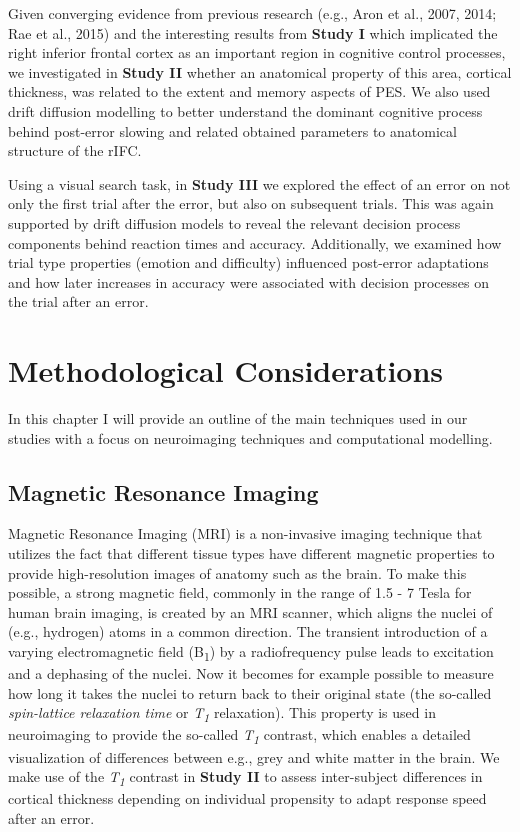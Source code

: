 \documentclass[12pt,openany]{book}
\theoremstyle{definition}
\theoremstyle{definition}
\theoremstyle{definition}
\theoremstyle{remark}
\begin{document}
Given converging evidence from previous research (e.g., Aron et al.,
2007, 2014; Rae et al., 2015) and the interesting results from
\textbf{Study I} which implicated the right inferior frontal cortex as
an important region in cognitive control processes, we investigated in
\textbf{Study II} whether an anatomical property of this area, cortical
thickness, was related to the extent and memory aspects of PES. We also
used drift diffusion modelling to better understand the dominant
cognitive process behind post-error slowing and related obtained
parameters to anatomical structure of the rIFC.

Using a visual search task, in \textbf{Study III} we explored the effect
of an error on not only the first trial after the error, but also on
subsequent trials. This was again supported by drift diffusion models to
reveal the relevant decision process components behind reaction times
and accuracy. Additionally, we examined how trial type properties
(emotion and difficulty) influenced post-error adaptations and how later
increases in accuracy were associated with decision processes on the
trial after an error.

\chapter{Methodological
Considerations}\label{methodological-considerations}

In this chapter I will provide an outline of the main techniques used in
our studies with a focus on neuroimaging techniques and computational
modelling.

\section{Magnetic Resonance Imaging}\label{magnetic-resonance-imaging}

Magnetic Resonance Imaging (MRI) is a non-invasive imaging technique
that utilizes the fact that different tissue types have different
magnetic properties to provide high-resolution images of anatomy such as
the brain. To make this possible, a strong magnetic field, commonly in
the range of 1.5 - 7 Tesla for human brain imaging, is created by an MRI
scanner, which aligns the nuclei of (e.g., hydrogen) atoms in a common
direction. The transient introduction of a varying electromagnetic field
(B\textsubscript{1}) by a radiofrequency pulse leads to excitation and a
dephasing of the nuclei. Now it becomes for example possible to measure
how long it takes the nuclei to return back to their original state (the
so-called \emph{spin-lattice relaxation time} or
\emph{T\textsubscript{1}} relaxation). This property is used in
neuroimaging to provide the so-called \emph{T\textsubscript{1}}
contrast, which enables a detailed visualization of differences between
e.g., grey and white matter in the brain. We make use of the
\emph{T\textsubscript{1}} contrast in \textbf{Study II} to assess
inter-subject differences in cortical thickness depending on individual
propensity to adapt response speed after an error.
\end{document}

